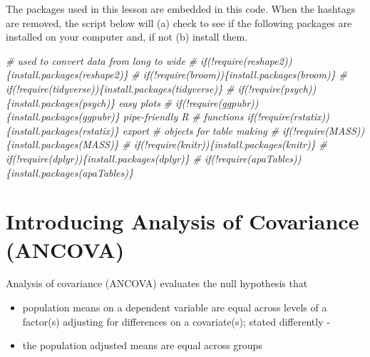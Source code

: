 \documentclass[
  11pt,
]{book}
\newenvironment{Shaded}{\begin{snugshade}}{\end{snugshade}}
\newcommand{\CommentTok}[1]{\textcolor[rgb]{0.56,0.35,0.01}{\textit{#1}}}
\providecommand{\tightlist}{%
  \setlength{\itemsep}{0pt}\setlength{\parskip}{0pt}}
\begin{document}
The packages used in this lesson are embedded in this code. When the hashtags are removed, the script below will (a) check to see if the following packages are installed on your computer and, if not (b) install them.

\begin{Shaded}
\begin{Highlighting}[]
\CommentTok{\# used to convert data from long to wide}
\CommentTok{\# if(!require(reshape2))\{install.packages(\textquotesingle{}reshape2\textquotesingle{})\}}
\CommentTok{\# if(!require(broom))\{install.packages(\textquotesingle{}broom\textquotesingle{})\}}
\CommentTok{\# if(!require(tidyverse))\{install.packages(\textquotesingle{}tidyverse\textquotesingle{})\}}
\CommentTok{\# if(!require(psych))\{install.packages(\textquotesingle{}psych\textquotesingle{})\} easy plots}
\CommentTok{\# if(!require(ggpubr))\{install.packages(\textquotesingle{}ggpubr\textquotesingle{})\} pipe{-}friendly R}
\CommentTok{\# functions if(!require(rstatix))\{install.packages(\textquotesingle{}rstatix\textquotesingle{})\} export}
\CommentTok{\# objects for table making}
\CommentTok{\# if(!require(MASS))\{install.packages(\textquotesingle{}MASS\textquotesingle{})\}}
\CommentTok{\# if(!require(knitr))\{install.packages(\textquotesingle{}knitr\textquotesingle{})\}}
\CommentTok{\# if(!require(dplyr))\{install.packages(\textquotesingle{}dplyr\textquotesingle{})\}}
\CommentTok{\# if(!require(apaTables))\{install.packages(\textquotesingle{}apaTables\textquotesingle{})\}}
\end{Highlighting}
\end{Shaded}

\hypertarget{introducing-analysis-of-covariance-ancova}{%
\section{Introducing Analysis of Covariance (ANCOVA)}\label{introducing-analysis-of-covariance-ancova}}

Analysis of covariance (ANCOVA) evaluates the null hypothesis that

\begin{itemize}
\tightlist
\item
  population means on a dependent variable are equal across levels of a factor(s) adjusting for differences on a covariate(s); stated differently -
\item
  the population adjusted means are equal across groups
\end{itemize}
\end{document}
